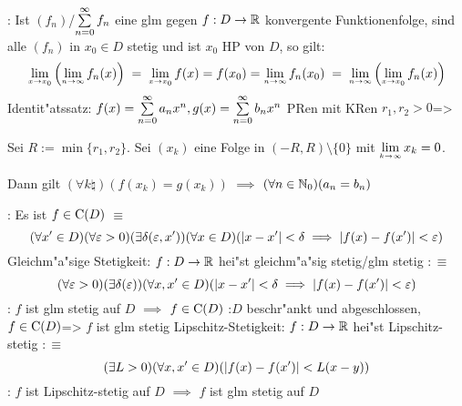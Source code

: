 \remark:{
  Ist $(f_n)$/$\sumn 0 f_n$ eine glm gegen $f:D\to\mathbb R$ konvergente Funktionenfolge,
  sind alle $(f_n)$ in $x_0\in D$ stetig und ist $x_0$ HP von $D$,
  so gilt:
  \[\limx \xnull\left(\limn f_n(x)\right) \; = \;
    \limx \xnull f(x)=f(x_0)=\limn f_n(x_0) \; = \;
    \limn \left( \limx \xnull f_n(x) \right)
    \]
  }
\theorem Identit"atssatz:
  $f(x)=\sumn 0 a_n x^n, g(x)=\sumn 0 b_n x^n$ PRen mit KRen $r_1,r_2>0$=>{
    Sei $R:=\min\{r_1,r_2\}$. Sei $(x_k)$ eine Folge in $(-R,R)\setminus\{0\}$
    mit $\limes k->\infty x_k=0$.\par
    Dann gilt $(\forall k\natural)(f(x_k)=g(x_k))$ $\implies$
      $(\forall n\in\mathbb N_0)(a_n=b_n)$
  }
\remark:{
  Es ist $f\in{\rm C}(D)$ $\equiv$
  \[(\forall x'\in D)(\forall \varepsilon>0)(\exists \delta(\varepsilon,x'))(\forall x\in D)
    (|x-x'|<\delta \implies |f(x)-f(x')|<\varepsilon)
    \]
  }
 Gleichm"a"sige Stetigkeit:{
  $f:D\to\mathbb R$ hei"st gleichm"a"sig stetig/glm stetig $:\equiv$
  \[(\forall \varepsilon>0)(\exists \delta(\varepsilon))(\forall x,x'\in D)
    (|x-x'|<\delta \implies |f(x)-f(x')|<\varepsilon)
    \]
  }
\remark:{
  $f$ ist glm stetig auf $D$ $\implies$ $f\in{\rm C}(D)$
  }
\theorem:$D$ beschr"ankt und abgeschlossen, $f\in{\rm C}(D)$=>{
  $f$ ist glm stetig
  }
 Lipschitz-Stetigkeit:{
  $f:D\to\mathbb R$ hei"st Lipschitz-stetig $:\equiv$
  \[(\exists L>0)(\forall x,x'\in D)(|f(x)-f(x')|<L(x-y))
    \]
  }
\remark:{
  $f$ ist Lipschitz-stetig auf $D$ $\implies$ $f$ ist glm stetig auf $D$
  }
